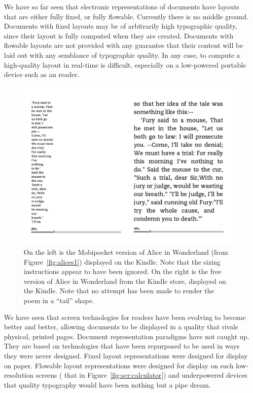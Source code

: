 We have so far seen that electronic representations of documents have layouts that are either fully fixed, or fully flowable. Currently there is no middle ground. Documents with fixed layouts may be of arbitrarily high typographic quality, since their layout is fully computed when they are created. Documents with flowable layouts are not provided with any guarantee that their content will be laid out with any semblance of typographic quality. In any case, to compute a high-quality layout in real-time is difficult, especially on a low-powered portable device such as an \ebook{} reader.

\begin{figure}
\includegraphics[width=\textwidth]{gfx/alices2}
\vspace{-0.2in}
\caption[Same document displayed on the Kindle]{On the left is the Mobipocket version of Alice in Wonderland (from Figure~\ref{fig:alices1}) displayed on the Kindle. Note that the sizing instructions appear to have been ignored. On the right is the free version of Alice in Wonderland from the Kindle store, displayed on the Kindle. Note that no attempt has been made to render the poem in a ``tail'' shape.}
\label{fig:alices2}
\end{figure}

We have seen that screen technologies for \ebook{} readers have been evolving to become better and better, allowing documents to be displayed in a quality that rivals physical, printed pages. Document representation paradigms have not caught up. They are based on technologies that have been repurposed to be used in ways they were never designed. Fixed layout representations were designed for display on paper. Flowable layout representations were designed for display on such low-resolution screens (\eg{} that in Figure~\ref{fig:scr:calculator}) and underpowered devices that quality typography would have been nothing but a pipe dream.



